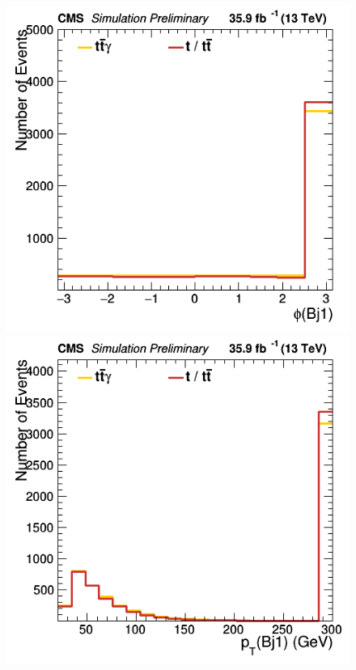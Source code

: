 \documentclass[11pt]{scrartcl}
\begin{document}
	\begin{figure}[H]
	\centering
	\begin{minipage}{.5\textwidth}
	  \centering
	  \includegraphics[width=0.75\linewidth]{figures/Notused/Bj1_phi.png}
	\end{minipage}%
	\begin{minipage}{.5\textwidth}
	  \centering
	  \includegraphics[width=0.75\linewidth]{figures/Notused/Bj1_pt.png}
	\end{minipage}
	\end{figure}
	
\end{document}
